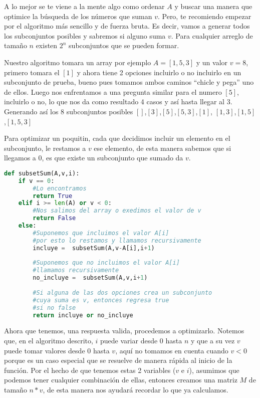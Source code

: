 A lo mejor se te viene a la mente algo como ordenar $A$ y buscar una manera que optimice la búsqueda de los números que suman $v$. Pero, te recomiendo empezar por el algoritmo más sencillo y de fuerza bruta. Es decir, vamos a generar todos los subconjuntos posibles y sabremos si alguno suma $v$. Para cualquier arreglo de tamaño $n$ existen $2^n$ subconjuntos que se pueden formar.

Nuestro algoritmo tomara un array por ejemplo $A=[1,5,3]$ y un valor $v=8$, primero tomara el $[1]$ y ahora tiene 2 opciones incluirlo o no incluirlo en un subconjunto de prueba, bueno pues tomamos ambos caminos ``chicle y pega'' uno de ellos. Luego nos enfrentamos a una pregunta similar para el numero $[5]$, incluirlo o no, lo que nos da como resultado 4 casos y así hasta llegar al 3. Generando así los 8 subconjuntos posibles $[]$,$[3]$,$[5]$,$[5,3]$,$[1]$,  $[1,3]$,$[1,5]$,$[1,5,3]$

Para optimizar un poquitin, cada que decidimos incluir un elemento en el subconjunto, le restamos a $v$ ese elemento, de esta manera sabemos que si llegamos a 0, es que existe un subconjunto que sumado da $v$.
 
\begin{lstlisting}[language=Python, caption=Subset sum no optimo]
def subsetSum(A,v,i):
    if v == 0:
        #Lo encontramos
        return True
    elif i >= len(A) or v < 0:
        #Nos salimos del array o exedimos el valor de v
        return False
    else:
        #Suponemos que incluimos el valor A[i]
        #por esto lo restamos y llamamos recursivamente
        incluye =  subsetSum(A,v-A[i],i+1)
        
        #Suponemos que no incluimos el valor A[i]
        #llamamos recursivamente
        no_incluye =  subsetSum(A,v,i+1)
        
        #Si alguna de las dos opciones crea un subconjunto
        #cuya suma es v, entonces regresa true
        #si no false
        return incluye or no_incluye
\end{lstlisting}

Ahora que tenemos, una respuesta valida, procedemos a optimizarlo. Notemos que, en el algoritmo descrito, $i$ puede variar desde 0 hasta $n$ y que a su vez $v$ puede tomar valores desde $0$ hasta $v$, aquí no tomamos en cuenta cuando $v < 0$ porque es un caso especial que se resuelve de manera rápida al inicio de la función. Por el hecho de que tenemos estas 2 variables ($v$ e $i$), asumimos que podemos tener cualquier combinación de ellas, entonces creamos una matriz $M$ de tamaño $n*v$, de esta manera nos ayudará recordar lo que ya calculamos.


